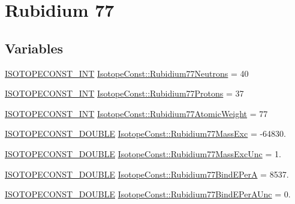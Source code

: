 \hypertarget{group___isotope_const-_rubidium-_rb77}{}\section{Rubidium 77}
\label{group___isotope_const-_rubidium-_rb77}
\subsection*{Variables}
\begin{DoxyCompactItemize}
\item 
\mbox{\hyperlink{group___isotope_const-_macros_ga5f18360b3e99483a35c32d789e62621c}{I\+S\+O\+T\+O\+P\+E\+C\+O\+N\+S\+T\+\_\+\+I\+NT}} \mbox{\hyperlink{group___isotope_const-_rubidium-_rb77_ga23f5315ab16d5c9bdd3db634c57f2c35}{Isotope\+Const\+::\+Rubidium77\+Neutrons}} = 40
\item 
\mbox{\hyperlink{group___isotope_const-_macros_ga5f18360b3e99483a35c32d789e62621c}{I\+S\+O\+T\+O\+P\+E\+C\+O\+N\+S\+T\+\_\+\+I\+NT}} \mbox{\hyperlink{group___isotope_const-_rubidium-_rb77_gaa909b97a93e6c38846b2b87d04fb68cf}{Isotope\+Const\+::\+Rubidium77\+Protons}} = 37
\item 
\mbox{\hyperlink{group___isotope_const-_macros_ga5f18360b3e99483a35c32d789e62621c}{I\+S\+O\+T\+O\+P\+E\+C\+O\+N\+S\+T\+\_\+\+I\+NT}} \mbox{\hyperlink{group___isotope_const-_rubidium-_rb77_gab8ed953cdd8b80fdf20aedad697e6695}{Isotope\+Const\+::\+Rubidium77\+Atomic\+Weight}} = 77
\item 
\mbox{\hyperlink{group___isotope_const-_macros_ga8f45a7272ce02c0b4c65c44636ed719a}{I\+S\+O\+T\+O\+P\+E\+C\+O\+N\+S\+T\+\_\+\+D\+O\+U\+B\+LE}} \mbox{\hyperlink{group___isotope_const-_rubidium-_rb77_gab14133d2764b14b8134f716b4759a465}{Isotope\+Const\+::\+Rubidium77\+Mass\+Exc}} = -\/64830.
\item 
\mbox{\hyperlink{group___isotope_const-_macros_ga8f45a7272ce02c0b4c65c44636ed719a}{I\+S\+O\+T\+O\+P\+E\+C\+O\+N\+S\+T\+\_\+\+D\+O\+U\+B\+LE}} \mbox{\hyperlink{group___isotope_const-_rubidium-_rb77_ga3714d93b4a600b373ebbc5bb9c2bc0d8}{Isotope\+Const\+::\+Rubidium77\+Mass\+Exc\+Unc}} = 1.
\item 
\mbox{\hyperlink{group___isotope_const-_macros_ga8f45a7272ce02c0b4c65c44636ed719a}{I\+S\+O\+T\+O\+P\+E\+C\+O\+N\+S\+T\+\_\+\+D\+O\+U\+B\+LE}} \mbox{\hyperlink{group___isotope_const-_rubidium-_rb77_gadd1677f0865a7905f3cc259646c996ad}{Isotope\+Const\+::\+Rubidium77\+Bind\+E\+PerA}} = 8537.
\item 
\mbox{\hyperlink{group___isotope_const-_macros_ga8f45a7272ce02c0b4c65c44636ed719a}{I\+S\+O\+T\+O\+P\+E\+C\+O\+N\+S\+T\+\_\+\+D\+O\+U\+B\+LE}} \mbox{\hyperlink{group___isotope_const-_rubidium-_rb77_ga613f8f1abca31869ca1741d2ca2c7a94}{Isotope\+Const\+::\+Rubidium77\+Bind\+E\+Per\+A\+Unc}} = 0.

\end{DoxyCompactItemize}
